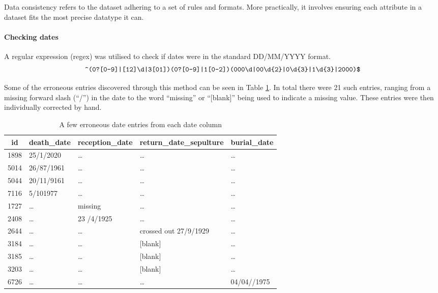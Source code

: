 Data consistency refers to the dataset adhering to a set of rules and formats. More practically, it involves ensuring each attribute in a dataset fits the most precise datatype it can.

\paragraph{Checking dates}{A regular expression (regex) was utilised to check if dates were in the standard DD/MM/YYYY format.
\begin{equation}
    \texttt{\textasciicircum(0?[0-9]|[12]\textbackslash d|3[01])\/(0?[0-9]|1[0-2])\/(000\textbackslash d|00\textbackslash d\{2\}|0\textbackslash d\{3\}|1\textbackslash d\{3\}|2000)\$}
\end{equation}

Some of the erroneous entries discovered through this method can be seen in Table \ref{tab:error-dates}. In total there were 21 such entries, ranging from a missing forward slash (``/'') in the date to the word ``missing'' or ``[blank]'' being used to indicate a missing value. These entries were then individually corrected by hand.}

\begin{table}[htbp]
\centering
\caption{A few erroneous date entries from each date column}
\label{tab:error-dates}
\begin{tabular}{@{}cllll@{}}
\toprule
\textbf{id} & \textbf{death\_date} & \textbf{reception\_date} & \textbf{return\_date\_sepulture} & \textbf{burial\_date} \\
\midrule
1898 & 25/1/2020 & \ldots & \ldots & \ldots \\
5014 & 26/87/1961 & \ldots & \ldots & \ldots \\
5044 & 20/11/9161 & \ldots & \ldots & \ldots \\
7116 & 5/101977 & \ldots & \ldots & \ldots \\
1727 & \ldots & missing & \ldots & \ldots \\
2408 & \ldots & 23 /4/1925 & \ldots & \ldots \\
2644 & \ldots & \ldots & crossed out 27/9/1929 & \ldots \\
3184 & \ldots & \ldots & [blank] & \ldots \\
3185 & \ldots & \ldots & [blank] & \ldots \\
3203 & \ldots & \ldots & [blank] & \ldots \\
6726 & \ldots & \ldots & \ldots & 04/04//1975 \\
\bottomrule
\end{tabular}
\end{table}


